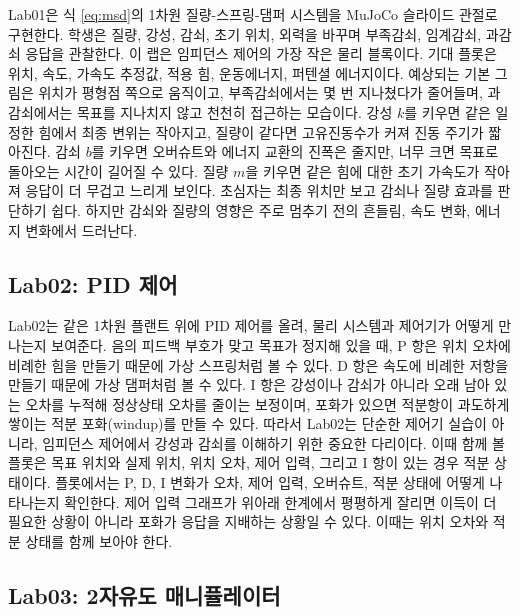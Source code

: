 Lab01은 식 \eqref{eq:msd}의 1차원 질량-스프링-댐퍼 시스템을 MuJoCo 슬라이드 관절로 구현한다.
학생은 질량, 강성, 감쇠, 초기 위치, 외력을 바꾸며 부족감쇠, 임계감쇠, 과감쇠 응답을 관찰한다.
이 랩은 임피던스 제어의 가장 작은 물리 블록이다.
기대 플롯은 위치, 속도, 가속도 추정값, 적용 힘, 운동에너지, 퍼텐셜 에너지이다.
예상되는 기본 그림은 위치가 평형점 쪽으로 움직이고, 부족감쇠에서는 몇 번 지나쳤다가 줄어들며, 과감쇠에서는 목표를 지나치지 않고 천천히 접근하는 모습이다.
강성 $k$를 키우면 같은 일정한 힘에서 최종 변위는 작아지고, 질량이 같다면 고유진동수가 커져 진동 주기가 짧아진다.
감쇠 $b$를 키우면 오버슈트와 에너지 교환의 진폭은 줄지만, 너무 크면 목표로 돌아오는 시간이 길어질 수 있다.
질량 $m$을 키우면 같은 힘에 대한 초기 가속도가 작아져 응답이 더 무겁고 느리게 보인다.
초심자는 최종 위치만 보고 감쇠나 질량 효과를 판단하기 쉽다.
하지만 감쇠와 질량의 영향은 주로 멈추기 전의 흔들림, 속도 변화, 에너지 변화에서 드러난다.

\subsection{Lab02: PID 제어}

Lab02는 같은 1차원 플랜트 위에 PID 제어를 올려, 물리 시스템과 제어기가 어떻게 만나는지 보여준다.
음의 피드백 부호가 맞고 목표가 정지해 있을 때, P 항은 위치 오차에 비례한 힘을 만들기 때문에 가상 스프링처럼 볼 수 있다.
D 항은 속도에 비례한 저항을 만들기 때문에 가상 댐퍼처럼 볼 수 있다.
I 항은 강성이나 감쇠가 아니라 오래 남아 있는 오차를 누적해 정상상태 오차를 줄이는 보정이며, 포화가 있으면 적분항이 과도하게 쌓이는 적분 포화(windup)를 만들 수 있다.
따라서 Lab02는 단순한 제어기 실습이 아니라, 임피던스 제어에서 강성과 감쇠를 이해하기 위한 중요한 다리이다.
이때 함께 볼 플롯은 목표 위치와 실제 위치, 위치 오차, 제어 입력, 그리고 I 항이 있는 경우 적분 상태이다.
플롯에서는 P, D, I 변화가 오차, 제어 입력, 오버슈트, 적분 상태에 어떻게 나타나는지 확인한다.
제어 입력 그래프가 위아래 한계에서 평평하게 잘리면 이득이 더 필요한 상황이 아니라 포화가 응답을 지배하는 상황일 수 있다.
이때는 위치 오차와 적분 상태를 함께 보아야 한다.

\subsection{Lab03: 2자유도 매니퓰레이터}

